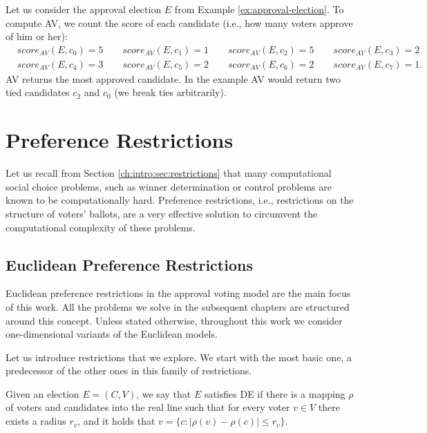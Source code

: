 \begin{example}\label{ex:approval-voting}
    Let us consider the approval election $E$ from Example \ref{ex:approval-election}.
    To compute AV, we count the score of each candidate (i.e., how many voters approve of him or her):
    \begin{align*}
        & score_{AV}(E,c_0)=5 \qquad score_{AV}(E,c_1)=1 \qquad score_{AV}(E,c_2)=5 \qquad score_{AV}(E,c_3)=2 \\
        & score_{AV}(E,c_4)=3 \qquad score_{AV}(E,c_5)=2 \qquad score_{AV}(E,c_6)=2 \qquad score_{AV}(E,c_7)=1.
    \end{align*}
    AV returns the most approved candidate.
    In the example AV would return two tied candidates $c_2$ and $c_0$ (we break ties arbitrarily).
\end{example}


\section{Preference Restrictions}\label{ch2:sec:pref-restrictions}
Let us recall from Section \ref{ch:intro:sec:restrictions} that
many computational social choice problems, such as winner determination or control problems are known to be computationally hard.
Preference restrictions, i.e., restrictions on the structure of voters’ ballots,
are a very effective solution to circumvent the computational complexity of these problems.

\subsection{Euclidean Preference Restrictions}\label{ch2:sec:euc-pref-restrictions}
Euclidean preference restrictions in the approval voting model are the main focus of this work.
All the problems we solve in the subsequent chapters are structured around this concept.
Unless stated otherwise, throughout this work we consider one-dimensional variants of the Euclidean models.

Let us introduce restrictions that we explore.
We start with the most basic one, a predecessor of the other ones
in this family of restrictions. 

\begin{pref-restriction}
Given an election $E = (C,V)$, we say that $E$ satisfies DE
if there is a mapping $\rho$ of voters and candidates into the real line such that
for every voter $v \in V$ there exists a radius $r_v$, and it holds that $v = \{c : |\rho(v) - \rho(c)| \leq r_v\}$.
\end{pref-restriction}

